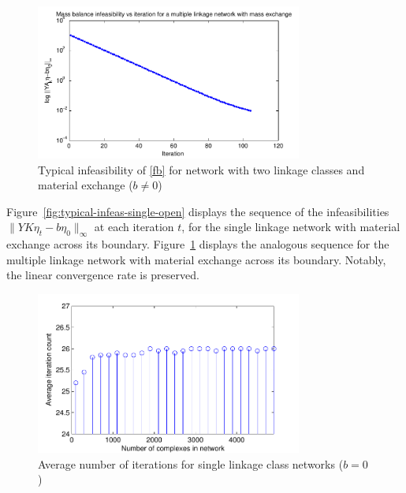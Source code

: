 \documentclass[smallextended]{svjour3}       %
\newcommand*{\0}{\mathbf{0}}
\newcommand*{\1}{\mathbf{1}}
\begin{document}
\begin{figure}%
   \centering
   \includegraphics[width=0.78\textwidth]{InfeasibilityVsIterationOpenMultiple}
   \caption{Typical infeasibility of \eqref{fb} for network with
            two linkage classes and material exchange ($b\neq0$)}
   \label{fig:typical-infeas-multiple-open}
\end{figure}

Figure~\ref{fig:typical-infeas-single-open} displays
the sequence of the infeasibilities $\|YK\eta_t-b\eta_0\|_\infty$ 
at each iteration $t$, for the single linkage network with material 
exchange across its boundary. Figure~\ref{fig:typical-infeas-multiple-open} 
displays the analogous sequence for the multiple linkage network with material
exchange across its boundary. Notably, the linear convergence rate
is preserved.

\begin{figure}%
   \centering
   \includegraphics[width=0.78\textwidth]{SingleNetAvgIterationsVsNetSize} 
   \caption{Average number of iterations for single linkage class
            networks ($b=0$)}
   \label{fig:iteration-count-simple} 
\end{figure}
\end{document}
